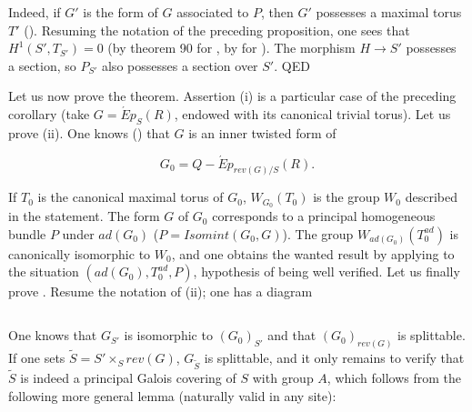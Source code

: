 Indeed, if \(G'\) is the form of \(G\) associated to \(P\), then \(G'\) possesses a maximal torus \(T'\) ().
Resuming the notation of the preceding proposition, one sees that \(H^{1}(S', T_{S'}) = 0\) (by theorem 90 for , by
 for ). The morphism \(H \to S'\) possesses a section, so \(P_{S'}\) also possesses a section over \(S'\). QED

Let us now prove the theorem. Assertion (i) is a particular case of the preceding corollary (take \(G =
\acute{E}p_{S}(R)\), endowed with its canonical trivial torus). Let us prove (ii). One knows () that \(G\) is an inner
twisted form of

\[ G_{0} = Q-\acute{E}p_{rev(G)/S}(R). \]

If \(T_0\) is the canonical maximal torus of \(G_0\), \(W_{G_{0}}(T_{0})\) is the group \(W_0\) described in the statement. The
form \(G\) of \(G_0\) corresponds to a principal homogeneous bundle \(P\) under \(ad(G_{0})\) (\(P = Isomint(G_{0}, G)\)). The
group \(W_{ad(G_{0})}(T^{ad}_{0})\) is canonically isomorphic to \(W_0\), and one obtains the wanted result by applying
 to the situation \((ad(G_{0}), T^{ad}_{0}, P)\), hypothesis  of  being well verified. Let us finally prove
. Resume the notation of (ii); one has a diagram

\[
  
\]

One knows that \(G_{S'}\) is isomorphic to \((G_{0})_{S'}\) and that \((G_{0})_{rev(G)}\) is splittable. If one sets
\(\tilde{S} = S' \times_{S} rev(G)\), \(G_{\tilde{S}}\) is splittable, and it only remains to verify that \(\tilde{S}\) is
indeed a principal Galois covering of \(S\) with group \(A\), which follows from the following more general lemma (naturally
valid in any site):
